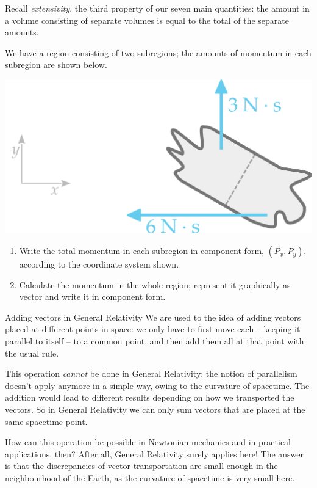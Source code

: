 \documentclass[a4paper,12pt,%
onecolumn,oneside,titlepage,%
british%
]{memoir}
\renewcommand*{\|}[1][]{\nonscript\:#1\vert\nonscript\:\mathopen{}}
\begin{document}
\bigskip


\begin{exercise}
  Recall \emph{extensivity}, the third property of our seven main quantities: the amount in a volume consisting of separate volumes is equal to the total of the separate amounts.

We have a region consisting of two subregions; the amounts of momentum in each subregion are shown below.
  \begin{center}
    \includegraphics[width=0.5\linewidth]{images/exercise_momentumsum.pdf}
  \end{center}
  \begin{enumerate}[exerc]
  \item Write the total momentum in each subregion in component form, $(P_{x}, P_{y})$, according to the coordinate system shown.
  \item Calculate the momentum in the whole region; represent it graphically as vector and write it in component form.
  \end{enumerate}
\end{exercise}

\begin{extra}{Adding vectors in General Relativity}
 We are used to the idea of adding vectors placed at different points in space: we only have to first move each -- keeping it parallel to itself -- to a common point, and then add them all at that point with the usual rule.

  This operation \emph{cannot} be done in General Relativity: the notion of parallelism doesn't apply anymore in a simple way, owing to the curvature of spacetime. The addition would lead to different results depending on how we transported the vectors. So in General Relativity we can only sum vectors that are placed at the same spacetime point.

  How can this operation be possible in Newtonian mechanics and in practical applications, then? After all, General Relativity surely applies here! The answer is that the discrepancies of vector transportation are small enough in the neighbourhood of the Earth, as the curvature of spacetime is very small here.
\end{extra}
\end{document}
